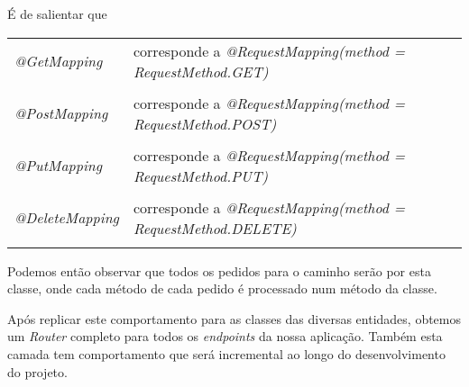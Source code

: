 É de salientar que\\
\begin{tabular}{ll}\\
	\emph{@GetMapping} & corresponde a \emph{@RequestMapping(method = RequestMethod.GET)}\\
	\\
	\emph{@PostMapping} & corresponde a \emph{@RequestMapping(method = RequestMethod.POST)}\\
	\\
	\emph{@PutMapping} & corresponde a \emph{@RequestMapping(method = RequestMethod.PUT)}\\
	\\
	\emph{@DeleteMapping} & corresponde a \emph{@RequestMapping(method = RequestMethod.DELETE)}\\
	\\
\end{tabular}

Podemos então observar que todos os pedidos para o caminho \emph{\event} serão por esta classe, onde cada método de cada pedido é processado num método da classe.

Após replicar este comportamento para as classes das diversas entidades, obtemos um \emph{Router} completo para todos os \emph{endpoints} da nossa aplicação. Também esta camada tem comportamento que será incremental ao longo do desenvolvimento do projeto.
